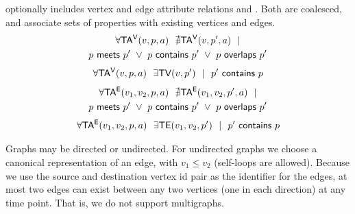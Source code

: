 \begin{definition}[TGraph]
\tve optionally includes vertex and edge attribute relations \tav
and \tae.  Both are coalesced, and associate sets of properties with
existing vertices and edges.
\vspace{-0.3cm}
\begin{multline}
\forall \mathsf{TA^{V}}(v, p, a)~~\nexists \mathsf{TA^{V}}(v, p', a)~~| \\
                       p~\mathsf{meets}~p'~\lor~p~\mathsf{contains}~p'~\lor~p~\mathsf{overlaps}~p'
\label{def:tg:c4}
\end{multline}
\vspace{-0.5cm}
\begin{multline}
\forall \mathsf{TA^{V}}(v, p, a)~~\exists \textsf{TV}(v,p')~~|~~p'~\mathsf{contains}~p
\label{def:tg:c5}
\end{multline}
\vspace{-0.5cm}
\begin{multline}
\forall \mathsf{TA^{E}}(v_1, v_2, p, a)~~\nexists \mathsf{TA^{E}}(v_1, v_2, p', a)~~| \\
                       p~\mathsf{meets}~p'~\lor~p~\mathsf{contains}~p'~\lor~p~\mathsf{overlaps}~p'
\label{def:tg:c6}
\end{multline}
\vspace{-0.5cm}
\begin{multline}
\forall \mathsf{TA^{E}}(v_1, v_2, p, a)~~\exists \textsf{TE}(v_1,v_2,p')~~|~~p'~\mathsf{contains}~p
\label{def:tg:c7}
\end{multline}
\vspace{-0.6cm}
\label{def:tg}
\end{definition}
\vspace{-0.3cm}


Graphs may be directed or undirected.  For undirected graphs we choose
a canonical representation of an edge, with $v_1 \leq v_2$ (self-loops
are allowed).  Because we use the source and destination vertex id
pair as the identifier for the edges, at most two edges can exist
between any two vertices (one in each direction) at any time point.
That is, we do not support multigraphs.

